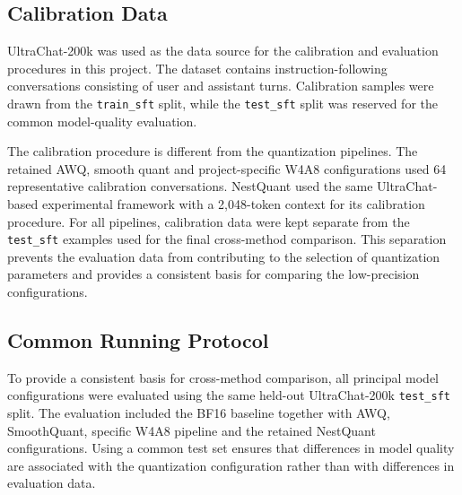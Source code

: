 \subsection{Calibration Data}

UltraChat-200k was used as the data source for the calibration and
evaluation procedures in this project. The dataset contains
instruction-following conversations consisting of user and assistant
turns\cite{ding2023enhancingchatlanguagemodels}. Calibration samples were drawn from the \texttt{train\_sft}
split, while the \texttt{test\_sft} split was reserved for the common
model-quality evaluation.

The calibration procedure is different from the quantization pipelines. The retained AWQ, smooth quant and project-specific W4A8 configurations used 64 representative calibration conversations. NestQuant used the same UltraChat-based experimental framework with a 2,048-token context for its calibration procedure. For all pipelines, calibration data were kept separate from the \texttt{test\_sft} examples used for the final cross-method comparison. This separation prevents the evaluation data from contributing to the selection of quantization parameters and provides a consistent basis for comparing the low-precision configurations.

\subsection{Common Running Protocol}
To provide a consistent basis for cross-method comparison, all principal
model configurations were evaluated using the same held-out
UltraChat-200k \texttt{test\_sft} split. The evaluation included the
BF16 baseline together with AWQ, SmoothQuant, specific W4A8
pipeline and the retained NestQuant configurations. Using a common test
set ensures that differences in model quality are associated with the
quantization configuration rather than with differences in evaluation
data.

